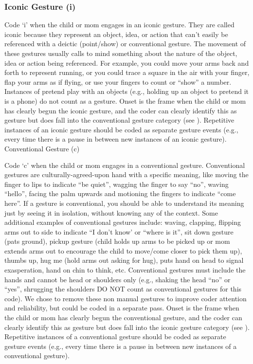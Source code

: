 \documentclass[
]{book}
\begin{document}
\hypertarget{iconic_gesture}{%
\subsubsection*{Iconic Gesture (i)}\label{iconic_gesture}}

Code `i' when the child or mom engages in an iconic gesture. They are called iconic because they represent an object, idea, or action that can't easily be referenced with a deictic (point/show) or conventional gesture. The movement of these gestures usually calls to mind something about the nature of the object, idea or action being referenced. For example, you could move your arms back and forth to represent running, or you could trace a square in the air with your finger, flap your arms as if flying, or use your fingers to count or ``show'' a number. Instances of pretend play with an objects (e.g., holding up an object to pretend it is a phone) do not count as a gesture.
Onset is the frame when the child or mom has clearly begun the iconic gesture, and the coder can clearly identify this as gesture but does fall into the conventional gesture category (see ). Repetitive instances of an iconic gesture should be coded as separate gesture events (e.g., every time there is a pause in between new instances of an iconic gesture).
Conventional Gesture (c)

Code `c' when the child or mom engages in a conventional gesture. Conventional gestures are culturally-agreed-upon hand with a specific meaning, like moving the finger to lips to indicate ``be quiet'', wagging the finger to say ``no'', waving ``hello'', facing the palm upwards and motioning the fingers to indicate ``come here''.
If a gesture is conventional, you should be able to understand its meaning just by seeing it in isolation, without knowing any of the context. Some additional examples of conventional gestures include: waving, clapping, flipping arms out to side to indicate ``I don't know' or ``where is it'', sit down gesture (pats ground), pickup gesture (child holds up arms to be picked up or mom extends arms out to encourage the child to move/come closer to pick them up), thumbs up, hug me (hold arms out asking for hug), puts hand on head to signal exasperation, hand on chin to think, etc.
Conventional gestures must include the hands and cannot be head or shoulders only (e.g., shaking the head ``no'' or ``yes'', shrugging the shoulders DO NOT count as conventional gestures for this code). We chose to remove these non manual gestures to improve coder attention and reliability, but could be coded in a separate pass.
Onset is the frame when the child or mom has clearly begun the conventional gesture, and the coder can clearly identify this as gesture but does fall into the iconic gesture category (see ). Repetitive instances of a conventional gesture should be coded as separate gesture events (e.g., every time there is a pause in between new instances of a conventional gesture).
\end{document}
